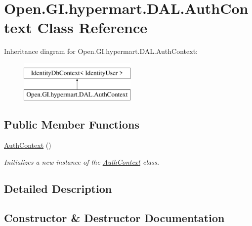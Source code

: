\hypertarget{class_open_1_1_g_i_1_1hypermart_1_1_d_a_l_1_1_auth_context}{}\section{Open.\+G\+I.\+hypermart.\+D\+A\+L.\+Auth\+Context Class Reference}
\label{class_open_1_1_g_i_1_1hypermart_1_1_d_a_l_1_1_auth_context}


 


Inheritance diagram for Open.\+G\+I.\+hypermart.\+D\+A\+L.\+Auth\+Context\+:\begin{figure}[H]
\begin{center}
\leavevmode
\includegraphics[height=2.000000cm]{class_open_1_1_g_i_1_1hypermart_1_1_d_a_l_1_1_auth_context}
\end{center}
\end{figure}
\subsection*{Public Member Functions}
\begin{DoxyCompactItemize}
\item 
\hyperlink{class_open_1_1_g_i_1_1hypermart_1_1_d_a_l_1_1_auth_context_ad497de9f8875b2f08c83fea4f5086dd1}{Auth\+Context} ()
\begin{DoxyCompactList}\small\item\em Initializes a new instance of the \hyperlink{class_open_1_1_g_i_1_1hypermart_1_1_d_a_l_1_1_auth_context}{Auth\+Context} class. \end{DoxyCompactList}\end{DoxyCompactItemize}


\subsection{Detailed Description}




\subsection{Constructor \& Destructor Documentation}
\hypertarget{class_open_1_1_g_i_1_1hypermart_1_1_d_a_l_1_1_auth_context_ad497de9f8875b2f08c83fea4f5086dd1}{}\label{class_open_1_1_g_i_1_1hypermart_1_1_d_a_l_1_1_auth_context_ad497de9f8875b2f08c83fea4f5086dd1} 
